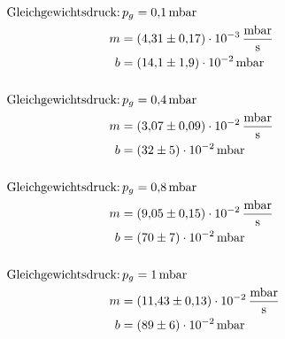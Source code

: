\begin{align*}
  \text{Gleichgewichtsdruck:} &\, p_g=\SI{0.1}{\milli\bar} \\
  m&= \SI{4.31\pm 0.17 e-3 }{\milli\bar\per\second}\\
  b&=\SI{14.1\pm1.9 e-2}{\milli\bar}\\
  \\
  \text{Gleichgewichtsdruck:} &\, p_g=\SI{0.4}{\milli\bar} \\
  m&= \SI{3.07\pm 0.09 e-2 }{\milli\bar\per\second}\\
  b&=\SI{32\pm5 e-2}{\milli\bar}\\
  \\
  \text{Gleichgewichtsdruck:} &\, p_g=\SI{0.8}{\milli\bar}\\
  m&= \SI{9.05\pm 0.15 e-2 }{\milli\bar\per\second}\\
  b&=\SI{70\pm7 e-2}{\milli\bar}\\
  \\
  \text{Gleichgewichtsdruck:} &\, p_g=\SI{1}{\milli\bar}\\
  m&= \SI{11.43\pm 0.13 e-2 }{\milli\bar\per\second}\\
  b&=\SI{89\pm 6 e-2}{\milli\bar}
\end{align*}
